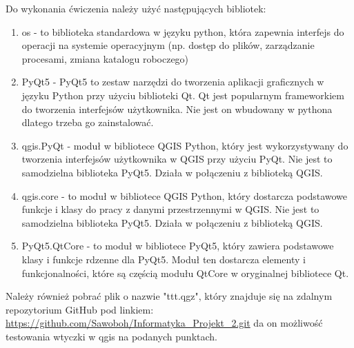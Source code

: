 Do wykonania ćwiczenia należy użyć następujących bibliotek:
\begin{enumerate}
	\item os - to biblioteka standardowa w języku python, która zapewnia interfejs do operacji na systemie operacyjnym (np. dostęp do plików, zarządzanie procesami, zmiana katalogu roboczego)
	\item PyQt5 - PyQt5 to zestaw narzędzi do tworzenia aplikacji graficznych w języku Python przy użyciu biblioteki Qt. Qt jest popularnym frameworkiem do tworzenia interfejsów użytkownika. Nie jest on wbudowany w pythona dlatego trzeba go zainstalować.
	\item qgis.PyQt - moduł w bibliotece QGIS Python, który jest wykorzystywany do tworzenia interfejsów użytkownika w QGIS przy użyciu PyQt. Nie jest to samodzielna biblioteka PyQt5. Działa w połączeniu z biblioteką QGIS.
	\item qgis.core - to moduł w bibliotece QGIS Python, który dostarcza podstawowe funkcje i klasy do pracy z danymi przestrzennymi w QGIS. Nie jest to samodzielna biblioteka PyQt5. Działa w połączeniu z biblioteką QGIS.
	\item PyQt5.QtCore - to moduł w bibliotece PyQt5, który zawiera podstawowe klasy i funkcje rdzenne dla PyQt5. Moduł ten dostarcza elementy i funkcjonalności, które są częścią modułu QtCore w oryginalnej bibliotece Qt.
\end{enumerate}

Należy również pobrać plik o nazwie "ttt.qgz", który znajduje się na zdalnym repozytorium GitHub pod linkiem: \href{https://github.com/Sawoboh/Informatyka_Projekt_2.git}{https://github.com/Sawoboh/Informatyka\_Projekt\_2.git} da on możliwość testowania wtyczki w qgis na podanych punktach.    